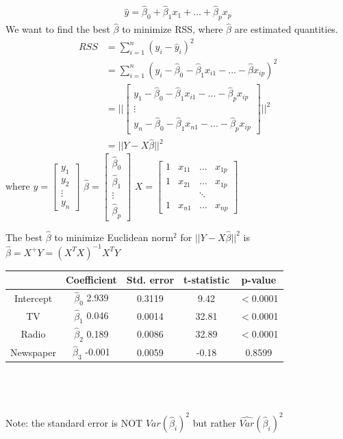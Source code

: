 \documentclass[12pt, letterpaper]{article}
\begin{document}
\begin{align*}
    \hat y = \hat \beta_0 + \hat \beta_1 x_1 + ... + \hat \beta_p x_p
\end{align*}
We want to find the best $\hat \beta$ to minimize RSS, where $\hat \beta$ are estimated quantities.
\begin{align*}
    RSS &= \sum_{i=1}^{n}(y_i - \hat y_i)^2 \\ 
    &= \sum_{i=1}^{n} (y_i - \hat \beta_0 - \hat\beta_1x_{i1} - ... - \hat \beta x_{ip})^2 \\
    &= \Bigg|\Bigg|\begin{bmatrix}
        y_1 - \hat \beta_0 -\hat \beta_1 x_{i1} - ... - \hat \beta_p x_{ip}\\
        \vdots \\
        y_n - \hat \beta_0 - \hat \beta_1x_{n1} -... - \hat \beta_p x_{ip}
    \end{bmatrix} \Bigg|\Bigg| ^2 \\ 
    &= || Y - X\hat\beta ||^2
\end{align*}
where $y = \begin{bmatrix}
    y_1 \\ y_2 \\ \vdots \\ y_n
\end{bmatrix}$ \qquad 
$\hat \beta = \begin{bmatrix}
    \hat \beta_0 \\ \hat \beta_1 \\ \vdots \\ \hat \beta_p
\end{bmatrix}$ \qquad
$X = \begin{bmatrix}
1 & x_{11} & \dots & x_{1p} \\
1 & x_{21} & \dots & x_{1p} \\
& & \ddots \\
1 & x_{n1} & \dots & x_{np}
\end{bmatrix}$

\noindent The best $\hat \beta$ to minimize Euclidean norm$^2$ for $|| Y - X\hat\beta ||^2$ is $\hat \beta = X^+Y = (X^TX)^{-1}X^TY$

\begin{tabular}{c | c c c c}
    & Coefficient & Std. error & t-statistic & p-value\\
    \hline
    Intercept & $\hat \beta_0$ 2.939 & 0.3119 & 9.42 & $<$0.0001\\ 
    TV & $\hat\beta_1$ 0.046 & 0.0014 & 32.81 & $<$0.0001\\ 
    Radio & $\hat\beta_2$ 0.189 & 0.0086 & 32.89 & $<$0.0001\\
    Newspaper & $\hat \beta_3$ -0.001 & 0.0059 & -0.18 & 0.8599
\end{tabular} \\ \\ \\ 
Note: the standard error is NOT $Var(\hat\beta_i)^2$ but rather $\hat{Var}(\hat\beta_i)^2$ \\
\end{document}
